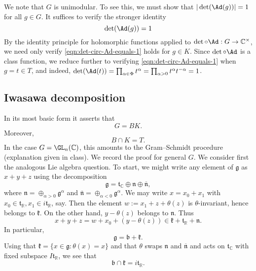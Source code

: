 \documentclass[reqno]{amsart} 
\begin{document}
We note that $G$ is unimodular.  To see this, we must show that $|\det(\Ad(g))| = 1$ for all $g \in G$.  It suffices to verify the stronger identity
\begin{equation}\label{eqn:det-circ-Ad-equals-1}
  \det(\Ad(g)) = 1
\end{equation}
By the identity principle for holomorphic functions applied to $\det \circ \Ad : G \rightarrow \mathbb{C}^\times$, we need only verify \eqref{eqn:det-circ-Ad-equals-1} holds for $g \in K$.  Since $\det \circ \Ad$ is a class function, we reduce further to verifying \eqref{eqn:det-circ-Ad-equals-1} when $g = t \in T$, and indeed, $\det(\Ad(t)) = \prod_{\alpha \in \Phi} t^\alpha = \prod_{\alpha > 0} t^{\alpha} t^{-\alpha} = 1$.

\subsection{Iwasawa decomposition}
\label{sec:iwas-decomp}
In its most basic form it asserts that
\begin{equation*}
  G = B  K.
\end{equation*}
Moreover,
\begin{equation*}
  B \cap K = T.
\end{equation*}
In the case $G = \GL_n(\mathbb{C})$, this amounts to the Gram--Schmidt procedure (explanation given in class).  We record the proof for general $G$.  We consider first the analogous Lie algebra question.  To start, we might write any element of $\mathfrak{g}$ as $x + y + z$ using the decomposition
\begin{equation*}
  \mathfrak{g} = \mathfrak{t}_{\mathbb{C}} \oplus \mathfrak{n} \oplus \overline{\mathfrak{n}},
\end{equation*}
where $\mathfrak{n} = \oplus_{\alpha > 0} \mathfrak{g}^\alpha$ and $\overline{ \mathfrak{n} } = \oplus_{\alpha < 0} \mathfrak{g}^\alpha$.  We may write $x = x_0 + x_1$ with $x_0 \in \mathfrak{t}_{\mathbb{R}}, x_1 \in i \mathfrak{t}_{\mathbb{R}}$, say.  Then the element $w := x_1 + z + \theta (z)$ is $\theta$-invariant, hence belongs to $\mathfrak{k}$.  On the other hand, $y - \theta(z)$ belongs to $\mathfrak{n}$.  Thus
\begin{equation*}
  x + y + z = w + x_0 + (y - \theta(z)) \in \mathfrak{k} + \mathfrak{t}_{\mathbb{R}} + \mathfrak{n} .
\end{equation*}
In particular,
\begin{equation}\label{eqn:Lie-alg-iwasawa}
  \mathfrak{g} =
  \mathfrak{b} + \mathfrak{k}.
\end{equation}
Using that $\mathfrak{k} = \{x \in \mathfrak{g} : \theta(x) = x\}$ and that $\theta$ swaps $\mathfrak{n}$ and $\overline{\mathfrak{n}}$ and acts on $\mathfrak{t}_{\mathbb{C}}$ with fixed subspace $I \mathfrak{t}_{\mathbb{R}}$, we see that
\begin{equation*}
  \mathfrak{b} \cap \mathfrak{k} = i \mathfrak{t}_{\mathbb{R}}.
\end{equation*}
\end{document}
